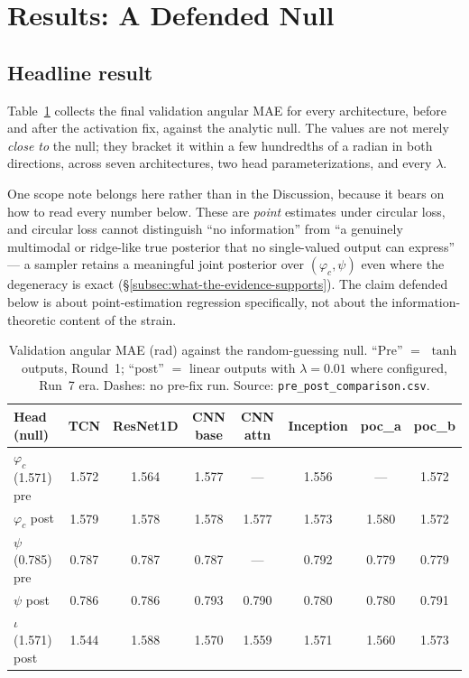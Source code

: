 \section{Results: A Defended Null}
\label{sec:phicpsi:results}

\subsection{Headline result}
\label{subsec:headline-result}

Table~\ref{tab:phicpsi:prepost} collects the final validation angular MAE for every architecture, before and after the activation fix, against the analytic null.
The values are not merely \emph{close to} the null; they bracket it within a few hundredths of a radian in both directions, across seven architectures, two head parameterizations, and every $\lambda$.

One scope note belongs here rather than in the Discussion, because it bears on how to read every number below.
These are \emph{point} estimates under circular loss, and circular loss cannot distinguish ``no information'' from ``a genuinely multimodal or ridge-like true posterior that no single-valued output can express'' --- a sampler retains a meaningful joint posterior over $(\varphi_c, \psi)$ even where the degeneracy is exact (\S\ref{subsec:what-the-evidence-supports}).
The claim defended below is about point-estimation regression specifically, not about the information-theoretic content of the strain.

\begin{table}[tbp]
    \centering
    \caption{Validation angular MAE (rad) against the random-guessing
    null. ``Pre'' $=$ $\tanh$ outputs, Round~1; ``post'' $=$ linear
    outputs with $\lambda = 0.01$ where configured, Run~7 era. Dashes: no
    pre-fix run. Source: \texttt{pre\_post\_comparison.csv}.}
    \label{tab:phicpsi:prepost}
    \small
    \begin{tabular}{@{}lccccccc@{}}
        \toprule
        Head (null)             & TCN   & ResNet1D & CNN base & CNN attn & Inception & poc\_a & poc\_b \\
        \midrule
        $\varphi_c$ (1.571) pre & 1.572 & 1.564    & 1.577    & ---      & 1.556     & ---    & 1.572  \\
        $\varphi_c$ post        & 1.579 & 1.578    & 1.578    & 1.577    & 1.573     & 1.580  & 1.572  \\
        $\psi$ (0.785) pre      & 0.787 & 0.787    & 0.787    & ---      & 0.792     & 0.779  & 0.779  \\
        $\psi$ post             & 0.786 & 0.786    & 0.793    & 0.790    & 0.780     & 0.780  & 0.791  \\
        $\iota$ (1.571) post    & 1.544 & 1.588    & 1.570    & 1.559    & 1.571     & 1.560  & 1.573  \\
        \bottomrule
    \end{tabular}
\end{table}

